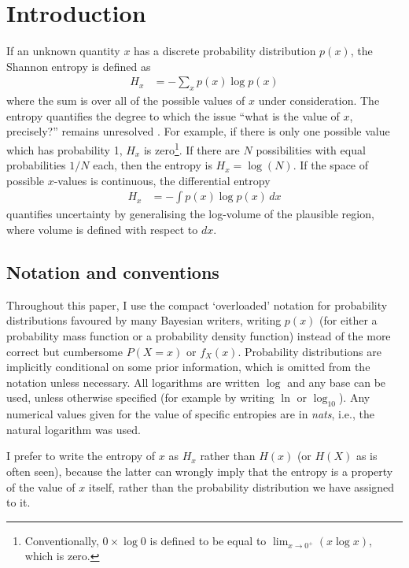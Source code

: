 \documentclass[entropy,article,accept,oneauthor,pdftex,10pt,a4paper]{mdpi}
\begin{document}

\section{Introduction}

If an unknown quantity $x$ has a discrete probability distribution $p(x)$,
the Shannon entropy \citep{shannon} is defined as
\begin{align}
H_{x} &= -\sum_{x} p(x) \log p(x)
\end{align}
where the sum is over all of the possible values of $x$ under consideration.
The entropy quantifies the degree to which the issue
``what is the value of $x$, precisely?'' remains unresolved
\citep{knuth_questions}. For example,
if there is only one possible value which has probability 1, $H_x$ is
zero\footnote{Conventionally, $0 \times \log 0$ is defined to be equal
to $\lim_{x \to 0^+} (x\log x)$, which is zero.}.
If there are $N$ possibilities with equal probabilities $1/N$ each,
then the entropy is $H_x = \log(N)$.
If the space of possible $x$-values is continuous, the differential
entropy
\begin{align}
H_{x} &= -\int p(x) \log p(x) \, dx
\end{align}
quantifies uncertainty by generalising the log-volume
of the plausible region, where volume is defined with respect to $dx$.

\subsection{Notation and conventions}

Throughout this paper, I use the compact
`overloaded' notation for probability distributions favoured by many
Bayesian writers, writing $p(x)$ (for either a probability mass function
or a probability density function) instead
of the more correct but cumbersome $P(X=x)$ or $f_X(x)$.
Probability distributions are implicitly conditional on some prior
information, which is omitted from the notation unless necessary.
All logarithms are written $\log$ and any base can be used, unless otherwise
specified (for example by writing $\ln$ or $\log_{10}$). Any numerical
values given for the value of specific entropies are in {\em nats}, i.e.,
the natural logarithm was used.

I prefer to write the entropy of $x$ as $H_x$ rather than $H(x)$
(or $H(X)$ as is often seen), because the latter can wrongly imply that
the entropy is a property of the value of $x$ itself, rather than
the probability distribution we have assigned to it.
\end{document}
